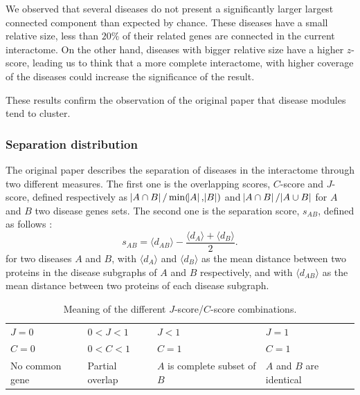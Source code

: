 \documentclass[letterpaper]{article}
\begin{document}
		We observed that several diseases do not present a significantly larger largest connected component
		than expected by chance. These diseases have a small relative size, less than $20\%$ of their related
		genes are connected in the current interactome. On the other hand, diseases with bigger relative size
		have a higher $z$-score, leading us to think that a more complete interactome, with higher coverage
		of the diseases could increase the significance of the result.

		These results confirm the observation of the original paper that disease modules tend to cluster.

		\subsubsection{Separation distribution}
		The original paper describes the separation of diseases in the interactome through two different
		measures. The first one is the overlapping scores, $C$-score and $J$-score, defined respectively as
		$\abs {A \cap B}/\min(\abs A, \abs B)$ and $\abs {A \cap B}/\abs {A \cup B}$ for $A$ and $B$ two
		disease genes sets. The second one is the separation score, $s_{AB}$, defined as follows :
		\begin{equation}
			s_{AB} = \langle d_{AB} \rangle - \frac {\langle d_A \rangle + \langle d_B \rangle}{2}.
		\end{equation}
		for two diseases $A$ and $B$, with $\langle d_A \rangle$ and $\langle d_B \rangle$ as the mean
		distance between two proteins in the disease subgraphs of $A$ and $B$ respectively, and with
		$\langle d_{AB} \rangle$ as the mean distance between two proteins of each disease subgraph.

		\begin{table}
		\begin{tabular}{m{}|m{}|m{}|m{}}
			$J = 0$ & $0 < J < 1$ & $J < 1$ & $J = 1$ \\
			$C = 0$ & $0 < C < 1$ & $C = 1$ & $C = 1$ \\
			\hline
			\hline
			No common gene & Partial overlap & $A$ is complete subset of $B$ & $A$ and $B$ are identical
		\end{tabular}
		\caption{Meaning of the different $J$-score/$C$-score combinations.\label{tab:J-C-scores}}
		\vspace{-.5cm}
		\end{table}
\end{document}
